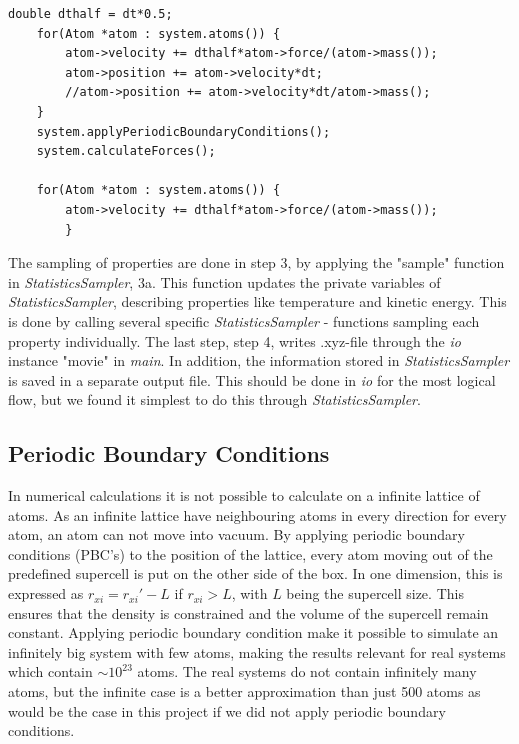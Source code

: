 \begin{lstlisting}[caption = {Snippet showing the main part of velocity verlet algorithm as applied in \textit{VelocityVerlet}}, label = {listing}]
	double dthalf = dt*0.5;
	for(Atom *atom : system.atoms()) {
		atom->velocity += dthalf*atom->force/(atom->mass());
		atom->position += atom->velocity*dt; 
		//atom->position += atom->velocity*dt/atom->mass();
	}
	system.applyPeriodicBoundaryConditions();
	system.calculateForces();
	
	for(Atom *atom : system.atoms()) {
		atom->velocity += dthalf*atom->force/(atom->mass());
		}

\end{lstlisting}		
 
 The sampling of properties are done in step 3, by applying the "sample" function in \textit{StatisticsSampler}, 3a. This function updates the private variables of  \textit{StatisticsSampler}, describing properties like temperature and kinetic energy. This is done by calling several specific \textit{StatisticsSampler} - functions sampling each property individually. The last step, step 4, writes .xyz-file through the \textit{io} instance "movie" in \textit{main}. In addition, the information stored in \textit{StatisticsSampler} is saved in a separate output file. This should be done in \textit{io} for the most logical flow, but we found it simplest to do this through \textit{StatisticsSampler}. 
  
\subsection{Periodic Boundary Conditions}

In numerical calculations it is not possible to calculate on a infinite lattice of atoms. As an infinite lattice have neighbouring atoms in every direction for every atom, an atom can not move into vacuum. By applying periodic boundary conditions (PBC's) to the position of the lattice, every atom moving out of the predefined supercell is put on the other side of the box. In one dimension, this is expressed as $ r_{xi} = r_{xi}' - L $ if $ r_{xi} >L $, with $ L $ being the supercell size. This ensures that the density is constrained and the volume of the supercell remain constant. Applying periodic boundary condition make it possible to simulate an infinitely big system with few atoms, making the results relevant for real systems which contain $\sim 10^{23}$ atoms. The real systems do not contain infinitely many atoms, but the infinite case is a better approximation than just 500 atoms as would be the case in this project if we did not apply periodic boundary conditions.

